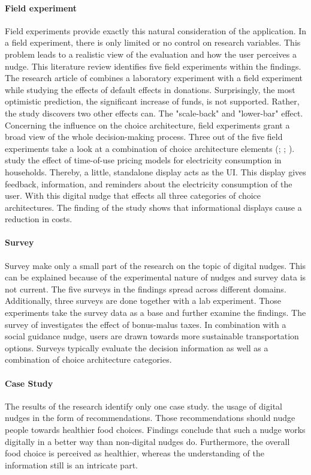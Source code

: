 \paragraph{Field experiment}
Field experiments provide exactly this natural consideration of the application. In a field experiment, there is only limited or no control on research variables. This problem leads to a realistic view of the evaluation and how the user perceives a nudge. This literature review identifies five field experiments within the findings. The research article of \cite{goswami_when_2016} combines a laboratory experiment with a field experiment while studying the effects of default effects in donations. Surprisingly, the most optimistic prediction, the significant increase of funds, is not supported. Rather, the study discovers two other effects can. The "scale-back" and "lower-bar" effect. 
Concerning the influence on the choice architecture, field experiments grant a broad view of the whole decision-making process. Three out of the five field experiments take a look at a combination of choice architecture elements (\cite{miller_effects_2016}; \cite{cosmo_nudging_2017}; \cite{mazar_if_2018}). \cite{cosmo_nudging_2017} study the effect of time-of-use pricing models for electricity consumption in households. Thereby, a little, standalone display acts as the UI. This display gives feedback, information, and reminders about the electricity consumption of the user. With this digital nudge that effects all three categories of choice architectures. The finding of the study shows that informational displays cause a reduction in costs.

\paragraph{Survey}
Survey make only a small part of the research on the topic of digital nudges. This can be explained because of the experimental nature of nudges and survey data is not current. The five surveys in the findings spread across different domains. Additionally, three surveys are done together with a lab experiment. Those experiments take the survey data as a base and further examine the findings. The survey of \cite{hilton_tax_2014} investigates the effect of bonus-malus taxes. In combination with a social guidance nudge, users are drawn towards more sustainable transportation options. Surveys typically evaluate the decision information as well as a combination of choice architecture categories.

\paragraph{Case Study}
 The results of the research identify only one case study. \cite{guthrie_nudging_2015} the usage of digital nudges in the form of recommendations. Those recommendations should nudge people towards healthier food choices. Findings conclude that such a nudge works digitally in a better way than non-digital nudges do. Furthermore, the overall food choice is perceived as healthier, whereas the understanding of the information still is an intricate part.


